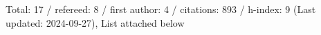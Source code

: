 Total: 17 / refereed: 8 / first author: 4 / citations: 893 / h-index: 9 (Last updated: 2024-09-27), List attached below